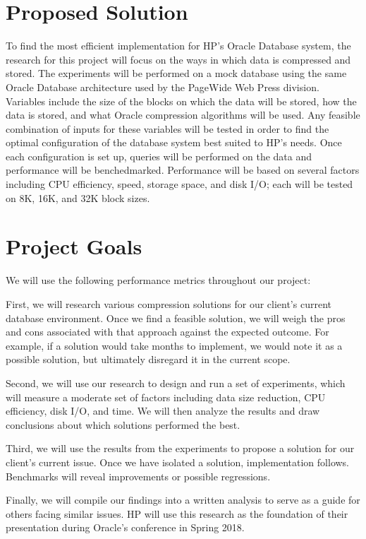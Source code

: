 \documentclass{article}
\begin{document}
\section{Proposed Solution}
To find the most efficient implementation for HP's Oracle Database system, the research for this project will focus on the ways in which data is compressed and stored.
The experiments will be performed on a mock database using the same Oracle Database architecture used by the PageWide Web Press division. 
Variables include the size of the blocks on which the data will be stored, how the data is stored, and what Oracle compression algorithms will be used.
Any feasible combination of inputs for these variables will be tested in order to find the optimal configuration of the database system best suited to HP's needs.
Once each configuration is set up, queries will be performed on the data and performance will be benchedmarked. Performance will be based on several factors including CPU efficiency, speed, storage space, and disk I/O; each will be tested on 8K, 16K, and 32K block sizes. 

\section{Project Goals}
We will use the following performance metrics throughout our project:

First, we will research various compression solutions for our client's current database environment. Once we find a feasible solution, we will weigh the pros and cons associated with that approach against the expected outcome. For example, if a solution would take months to implement, we would note it as a possible solution, but ultimately disregard it in the current scope. 

Second, we will use our research to design and run a set of experiments, which will measure a moderate set of factors including data size reduction, CPU efficiency, disk I/O, and time. We will then analyze the results and draw conclusions about which solutions performed the best. 

Third, we will use the results from the experiments to propose a solution for our client's current issue. Once we have isolated a solution, implementation follows. Benchmarks will reveal improvements or possible regressions.

Finally, we will compile our findings into a written analysis to serve as a guide for others facing similar issues. HP will use this research as the foundation of their presentation during Oracle's conference in Spring 2018.
\end{document}
